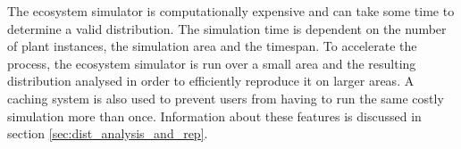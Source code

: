 The ecosystem simulator is computationally expensive and can take some time to determine a valid distribution. The simulation time is dependent on the number of plant instances, the simulation area and the timespan. To accelerate the process, the ecosystem simulator is run over a small area and the resulting distribution analysed in order to efficiently reproduce it on larger areas. A caching system is also used to prevent users from having to run the same costly simulation more than once. Information about these features is discussed in section \ref{sec:dist_analysis_and_rep}.
